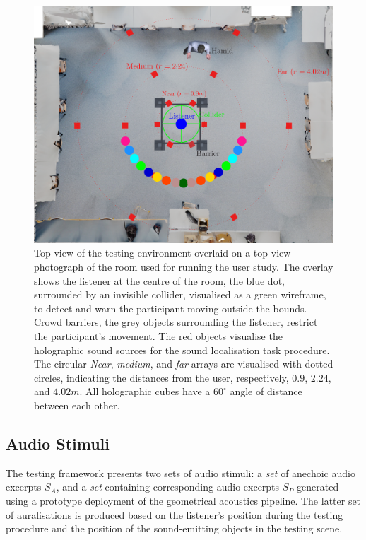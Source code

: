 \begin{figure}[htbp]
    \centering
    \includegraphics[width=1\linewidth]{7_evaluation/images/cst208topview-diagram2.png}
    \caption{Top view of the testing environment overlaid on a top view photograph of the room used for running the user study. The overlay shows the listener at the centre of the room, the blue dot, surrounded by an invisible collider, visualised as a green wireframe, to detect and warn the participant moving outside the bounds. Crowd barriers, the grey objects surrounding the listener, restrict the participant's movement. The red objects visualise the holographic sound sources for the sound localisation task procedure. The circular \emph{Near}, \emph{medium}, and \emph{far} arrays are visualised with dotted circles, indicating the distances from the user, respectively, $0.9$, $2.24$, and $4.02m$. All holographic cubes have a $60^\circ$ angle of distance between each other.}
    \label{fig:psycho-top-view}
\end{figure}
\subsection{Audio Stimuli}
The testing framework presents two sets of audio stimuli: a \emph{set} of anechoic audio excerpts $S_A$, and a \emph{set} containing corresponding audio excerpts $S_P$ generated using a prototype deployment of the geometrical acoustics pipeline. The latter set of auralisations is produced based on the listener's position during the testing procedure and the position of the sound-emitting objects in the testing scene. \par



